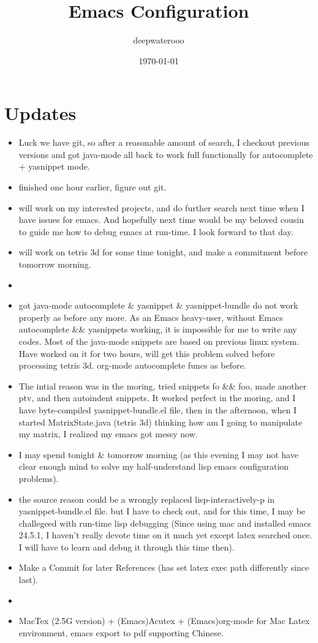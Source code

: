 \documentclass[9pt,b5paper]{article}
\author{deepwaterooo}
\date{\today}
\title{Emacs Configuration}
\begin{document}
\maketitle
\tableofcontents


\section{Updates}
\label{sec-1}
\begin{itemize}
\item Luck we have git, so after a reasonable amount of search, I checkout previous versions and got java-mode all back to work full functionally for autocomplete + yasnippet mode.
\item finished one hour earlier, figure out git.
\item will work on my interested projects, and do further search next time when I have issues for emacs. And hopefully next time would be my beloved cousin to guide me how to debug emacs at run-time. I look forward to that day.
\item will work on tetris 3d for some time tonight, and make a commitment before tomorrow morning.
\item 
\item got java-mode autocomplete \& yasnippet \& yasnippet-bundle do not work properly as before any more. As an Emacs heavy-user, without Emacs autocomplete \&\& yasnippets working, it is impossible for me to write any codes. Most of the java-mode snippets are based on previous linux system. Have worked on it for two hours, will get this problem solved before processing tetris 3d. org-mode autocomplete funcs as before.
\item The intial reason was in the moring, tried snippets fo \&\& foo, made another ptv, and then autoindent snippets. It worked perfect in the moring, and I have byte-compiled yasnippet-bundle.el file, then in the afternoon, when I started MatrixState.java (tetris 3d) thinking how am I going to manipulate my matrix, I realized my emacs got messy now.
\item I may spend tonight \& tomorrow morning (as this evening I may not have clear enough mind to solve my half-understand lisp emacs configuration problems).
\item the source reason could be a wrongly replaced lisp-interactively-p in yasnippet-bundle.el file. but I have to check out, and for this time, I may be challegeed with run-time lisp debugging (Since using mac and installed emacs 24.5.1, I haven’t really devote time on it much yet except latex searched once. I will have to learn and debug it through this time then).
\item Make a Commit for later References (has set latex exec path differently since last).
\item 
\item MacTex (2.5G version) + (Emacs)Acutex +  (Emacs)org-mode for Mac Latex environment, emacs export to pdf supporting Chinese.
\end{itemize}
\end{document}
